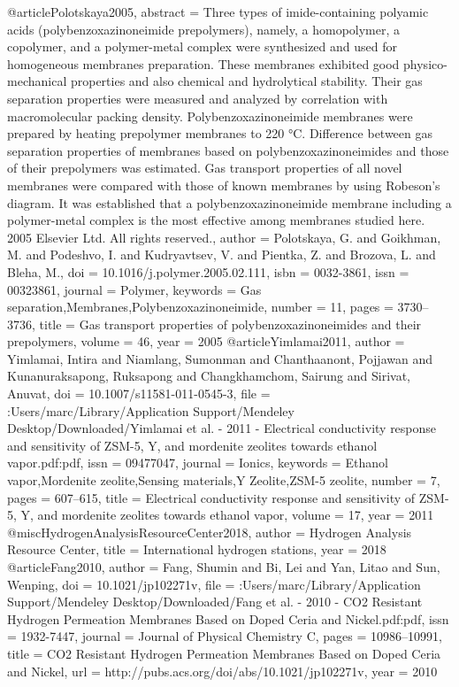 @article{Polotskaya2005,
abstract = {Three types of imide-containing polyamic acids (polybenzoxazinoneimide prepolymers), namely, a homopolymer, a copolymer, and a polymer-metal complex were synthesized and used for homogeneous membranes preparation. These membranes exhibited good physico-mechanical properties and also chemical and hydrolytical stability. Their gas separation properties were measured and analyzed by correlation with macromolecular packing density. Polybenzoxazinoneimide membranes were prepared by heating prepolymer membranes to 220 °C. Difference between gas separation properties of membranes based on polybenzoxazinoneimides and those of their prepolymers was estimated. Gas transport properties of all novel membranes were compared with those of known membranes by using Robeson's diagram. It was established that a polybenzoxazinoneimide membrane including a polymer-metal complex is the most effective among membranes studied here. {\textcopyright} 2005 Elsevier Ltd. All rights reserved.},
author = {Polotskaya, G. and Goikhman, M. and Podeshvo, I. and Kudryavtsev, V. and Pientka, Z. and Brozova, L. and Bleha, M.},
doi = {10.1016/j.polymer.2005.02.111},
isbn = {0032-3861},
issn = {00323861},
journal = {Polymer},
keywords = {Gas separation,Membranes,Polybenzoxazinoneimide},
number = {11},
pages = {3730--3736},
title = {{Gas transport properties of polybenzoxazinoneimides and their prepolymers}},
volume = {46},
year = {2005}
}
@article{Yimlamai2011,
author = {Yimlamai, Intira and Niamlang, Sumonman and Chanthaanont, Pojjawan and Kunanuraksapong, Ruksapong and Changkhamchom, Sairung and Sirivat, Anuvat},
doi = {10.1007/s11581-011-0545-3},
file = {:Users/marc/Library/Application Support/Mendeley Desktop/Downloaded/Yimlamai et al. - 2011 - Electrical conductivity response and sensitivity of ZSM-5, Y, and mordenite zeolites towards ethanol vapor.pdf:pdf},
issn = {09477047},
journal = {Ionics},
keywords = {Ethanol vapor,Mordenite zeolite,Sensing materials,Y Zeolite,ZSM-5 zeolite},
number = {7},
pages = {607--615},
title = {{Electrical conductivity response and sensitivity of ZSM-5, Y, and mordenite zeolites towards ethanol vapor}},
volume = {17},
year = {2011}
}
@misc{HydrogenAnalysisResourceCenter2018,
author = {{Hydrogen Analysis Resource Center}},
title = {{International hydrogen stations}},
year = {2018}
}
@article{Fang2010,
author = {Fang, Shumin and Bi, Lei and Yan, Litao and Sun, Wenping},
doi = {10.1021/jp102271v},
file = {:Users/marc/Library/Application Support/Mendeley Desktop/Downloaded/Fang et al. - 2010 - CO2 Resistant Hydrogen Permeation Membranes Based on Doped Ceria and Nickel.pdf:pdf},
issn = {1932-7447},
journal = {Journal of Physical Chemistry C},
pages = {10986--10991},
title = {{CO2 Resistant Hydrogen Permeation Membranes Based on Doped Ceria and Nickel}},
url = {http://pubs.acs.org/doi/abs/10.1021/jp102271v},
year = {2010}
}
